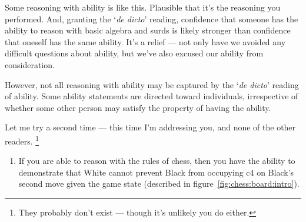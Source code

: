 \begin{note}
  Some reasoning with ability is like this.
  Plausible that it's the reasoning you performed.
  And, granting the `\emph{de dicto}' reading, confidence that someone has the ability to reason with basic algebra and surds is likely stronger than confidence that oneself has the same ability.
  It's a relief --- not only have we avoided any difficult questions about ability, but we've also excused our ability from consideration.

  However, not all reasoning with ability may be captured by the `\emph{de dicto}' reading of ability.
  Some ability statements are directed toward individuals, irrespective of whether some other person may satisfy the property of having the ability.
\end{note}

\begin{note}
  Let me try a second time --- this time I'm addressing you, and none of the other readers.\nolinebreak
  \footnote{They probably don't exist --- though it's unlikely you do either.}
  \begin{enumerate}
  \item\label{intro:AC:chess} If you are able to reason with the rules of chess, then you have the ability to demonstrate that White cannot prevent Black from occupying c4 on Black's second move given the game state (described in figure~\ref{fig:chess:board:intro}).
\end{enumerate}
\end{note}

